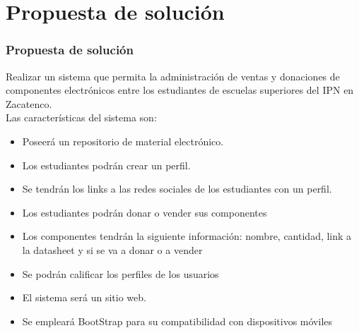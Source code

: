 \documentclass{beamer}
\begin{document}


\section{Propuesta de solución}

\begin{frame}
\frametitle{Propuesta de solución}
Realizar un sistema que permita la administración de ventas y donaciones de componentes electrónicos entre los estudiantes de escuelas superiores del IPN en Zacatenco.\\

Las características del sistema son:
\begin{itemize}
\item  Poseerá un repositorio de material electrónico.
\item Los estudiantes podrán crear un perfil.
\item  Se tendrán los links a las redes sociales de los estudiantes con un perfil.
\item Los estudiantes podrán donar o vender sus componentes
\item  Los componentes tendrán la siguiente información: nombre, cantidad, link a la datasheet y si se va a donar o a vender
\item  Se podrán calificar los perfiles de los usuarios
\item  El sistema será un sitio web.
\item Se empleará BootStrap para su compatibilidad con dispositivos móviles
\end{itemize}
\end{frame}
\end{document}
